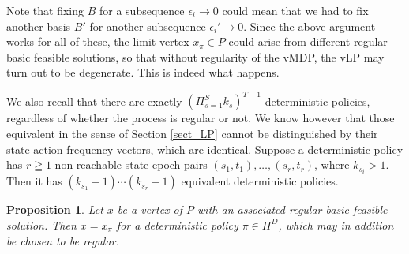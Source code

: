 \documentclass{article}
\newtheorem{lemma}[theorem]{Lemma}
\newtheorem{proposition}[theorem]{Proposition}
\theoremstyle{definition}
\numberwithin{equation}{section}
\begin{document}
Note that fixing $B$ for a subsequence $\epsilon_i \to 0$ could mean that we had to
fix another basis $B'$ for another subsequence $\epsilon_i'\to 0$. Since the above argument works for all of these,
the limit vertex $x_\pi \in P$ could arise from different regular basic feasible solutions, so that
without regularity of the vMDP, the vLP may turn out to be degenerate. This is indeed what happens.

%
%  


We also recall that there are exactly $(\Pi_{s=1}^Sk_s)^{T-1}$
deterministic policies, regardless of whether the process is regular or not. 
We know however that those equivalent in the sense of Section \ref{sect_LP} cannot be distinguished by their state-action frequency vectors, which are identical. 
Suppose a deterministic policy has $r \geqq 1$ non-reachable state-epoch pairs $(s_1,t_1),\dots,(s_r,t_r)$, where $k_{s_i} > 1$.  Then it has $(k_{s_1}-1)\cdots (k_{s_r}-1)$ equivalent 
deterministic policies.




\begin{proposition}
    Let $x$ be a vertex of $P$ with an associated regular basic feasible
    solution. 
    Then $x=x_\pi$ for a deterministic policy $\pi\in \Pi^D$, which may in addition be chosen to be regular.
\end{proposition}
\end{document}
